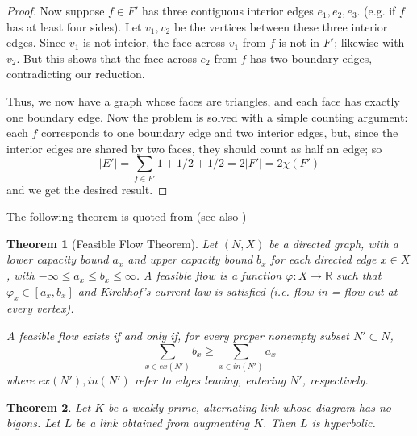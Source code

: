\documentclass[11pt]{amsart}
\newcommand{\RR}{\mathbb{R}}
\newcommand{\vphi}{\varphi}
\theoremstyle{plain}
\newtheorem{theorem}{Theorem}[section]
\theoremstyle{definition}
\begin{document}
\begin{proof}
Now suppose $f\in F'$ has three contiguous interior edges
$e_1,e_2,e_3$.
(e.g. if $f$ has at least four sides).
Let $v_1, v_2$ be the vertices between these three interior edges.
Since $v_1$ is not inteior,
the face across $v_1$ from $f$ is not in $F'$;
likewise with $v_2$.
But this shows that the face across $e_2$ from $f$
has two boundary edges, contradicting our reduction.


Thus, we now have a graph whose faces are triangles,
and each face has exactly one boundary edge.
Now the problem is solved with a simple counting argument:
each $f$ corresponds to one boundary edge and two interior edges,
but, since the interior edges are shared by two faces,
they should count as half an edge; so
\[
 |E'| = \sum_{f\in F'} 1 + 1/2 + 1/2 = 2|F'| = 2\chi(F')
\]
and we get the desired result.
\end{proof}


The following theorem is quoted from \cite{BandS}
(see also \cite{FF})

\begin{theorem}[Feasible Flow Theorem]
\label{t:feasible_flow}
Let $(N,X)$ be a directed graph,
with a \emph{lower capacity bound} $a_x$
and \emph{upper capacity bound} $b_x$
for each directed edge $x \in X$,
with $-\infty \leq a_x \leq b_x \leq \infty$.
A \emph{feasible flow} is a function $\vphi : X \to \RR$
such that $\vphi_x \in [a_x, b_x]$ and
Kirchhof's current law is satisfied
(i.e. flow in = flow out at every vertex).

A feasible flow exists if and only if,
for every proper nonempty subset $N' \subset N$,
\[
\sum_{x \in ex(N')} b_x \geq \sum_{x \in in(N')} a_x
\]
where $ex(N'), in(N')$ refer to edges leaving,
entering $N'$, respectively.
\end{theorem}



\begin{theorem}
\label{t:auglink_hyp}
Let $K$ be a weakly prime, alternating link whose diagram has no bigons.
Let $L$ be a link obtained from augmenting $K$.
Then $L$ is hyperbolic.
\end{theorem}
\end{document}
